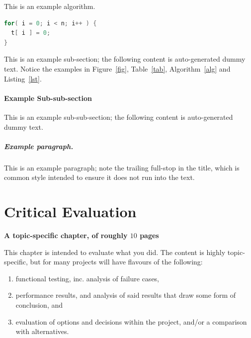 \documentclass[ %
                    author={Sam Phippen},
                supervisor={Dr. Rafal Bogacz},
                     title={Real time voice activity detectors in noisy personal computing environments},
                  subtitle={},
                    degree={MEng},
                      year={2012} ]{thesis}
\begin{document}
\begin{algorithm}[t]
\caption{This is an example algorithm.}
\label{alg}
\end{algorithm}

\begin{lstlisting}[float={t},caption={This is an example listing.},label={lst},language=C]
for( i = 0; i < n; i++ ) {
  t[ i ] = 0;
}
\end{lstlisting}

This is an example sub-section;
the following content is auto-generated dummy text.
Notice the examples in Figure~\ref{fig}, Table~\ref{tab}, Algorithm~\ref{alg}
and Listing~\ref{lst}.
\lipsum

\subsubsection{Example Sub-sub-section}

This is an example sub-sub-section;
the following content is auto-generated dummy text.
\lipsum

\paragraph{Example paragraph.}

This is an example paragraph; note the trailing full-stop in the title,
which is common style intended to ensure it does not run into the text.


\chapter{Critical Evaluation}
\label{chap:evaluation}

{\bf A topic-specific chapter, of roughly $10$ pages} 
\vspace{1cm} 

\noindent
This chapter is intended to evaluate what you did.  The content is highly 
topic-specific, but for many projects will have flavours of the following:

\begin{enumerate}
\item functional testing, inc. analysis of failure cases,
\item performance results, and analysis of said results that draw some 
      form of conclusion,
      and
\item evaluation of options and decisions within the project, and/or a
      comparison with alternatives.
\end{enumerate}
\end{document}
